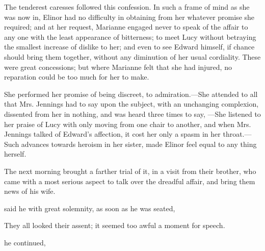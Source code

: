 The tenderest caresses followed this confession. In such a frame of mind as she was now in, Elinor had no difficulty in obtaining from her whatever promise she required; and at her request, Marianne engaged never to speak of the affair to any one with the least appearance of bitterness; to meet Lucy without betraying the smallest increase of dislike to her; and even to see Edward himself, if chance should bring them together, without any diminution of her usual cordiality. These were great concessions; but where Marianne felt that she had injured, no reparation could be too much for her to make.

She performed her promise of being discreet, to admiration.---She attended to all that Mrs. Jennings had to say upon the subject, with an unchanging complexion, dissented from her in nothing, and was heard three times to say, ---She listened to her praise of Lucy with only moving from one chair to another, and when Mrs. Jennings talked of Edward's affection, it cost her only a spasm in her throat.---Such advances towards heroism in her sister, made Elinor feel equal to any thing herself.

The next morning brought a farther trial of it, in a visit from their brother, who came with a most serious aspect to talk over the dreadful affair, and bring them news of his wife.

 said he with great solemnity, as soon as he was seated, 

They all looked their assent; it seemed too awful a moment for speech.

 he continued, 

